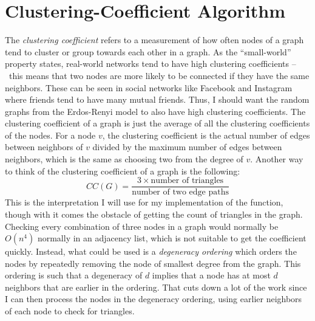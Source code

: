 \documentclass{article}
\begin{document}
\section{Clustering-Coefficient Algorithm}
    The \textit{clustering coefficient} refers to a measurement of how often
    nodes of a graph tend to cluster or group towards each other in a graph.
    As the ``small-world'' property states, real-world networks tend to have 
    high clustering coefficients – this means that two nodes are more likely to
    be connected if they have the same neighbors. These can be seen in social
    networks like Facebook and Instagram where friends tend to have many mutual
    friends. Thus, I should want the random graphs from the Erdos-Renyi model 
    to also have high clustering coefficients.
    \nextblurb
    The clustering coefficient of a graph is just the average of all the 
    clustering coefficients of the nodes. For a node $v$, the clustering
    coefficient is the actual number of edges between neighbors of $v$ divided
    by the maximum number of edges between neighbors, which is the same as
    choosing two from the degree of $v$. Another way to think of the clustering
    coefficient of a graph is the following:
    \begin{equation*}
        CC(G) = \frac{3 \times \textrm{number of triangles}}
            {\textrm{number of two edge paths}}
    \end{equation*}
    \noindent This is the interpretation I will use for my implementation of the 
    function, though with it comes the obstacle of getting the count of 
    triangles in the graph. Checking every combination of three nodes in a graph
    would normally be $O(n^4)$ normally in an adjacency list, which is not
    suitable to get the coefficient quickly. Instead, what could be used is a
    \textit{degeneracy ordering} which orders the nodes by repeatedly removing
    the node of smallest degree from the graph. This ordering is such that a
    degeneracy of $d$ implies that a node has at most $d$ neighbors that are 
    earlier in the ordering. That cuts down a lot of the work since I can then 
    process the nodes in the degeneracy ordering, using earlier neighbors of 
    each node to check for triangles.
\end{document}
